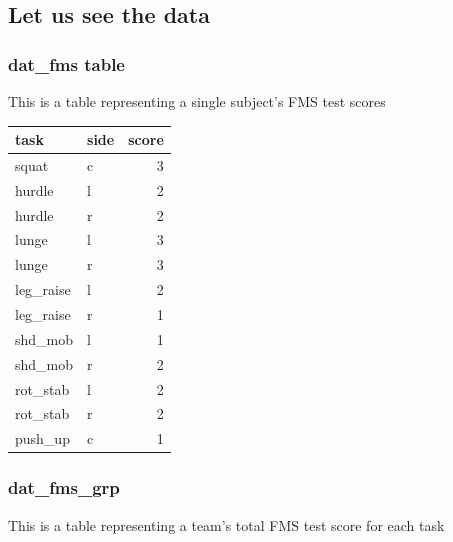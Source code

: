 \documentclass[
]{book}
\begin{document}
\hypertarget{let-us-see-the-data}{%
\subsection*{Let us see the data}\label{let-us-see-the-data}}

\hypertarget{dat_fms-table}{%
\subsubsection{dat\_fms table}\label{dat_fms-table}}

This is a table representing a single subject's FMS test scores

\begin{tabular}{l|l|r}
\hline
task & side & score\\
\hline
squat & c & 3\\
\hline
hurdle & l & 2\\
\hline
hurdle & r & 2\\
\hline
lunge & l & 3\\
\hline
lunge & r & 3\\
\hline
leg\_raise & l & 2\\
\hline
leg\_raise & r & 1\\
\hline
shd\_mob & l & 1\\
\hline
shd\_mob & r & 2\\
\hline
rot\_stab & l & 2\\
\hline
rot\_stab & r & 2\\
\hline
push\_up & c & 1\\
\hline
\end{tabular}

\hypertarget{dat_fms_grp}{%
\subsubsection{dat\_fms\_grp}\label{dat_fms_grp}}

This is a table representing a team's total FMS test score for each task
\end{document}
